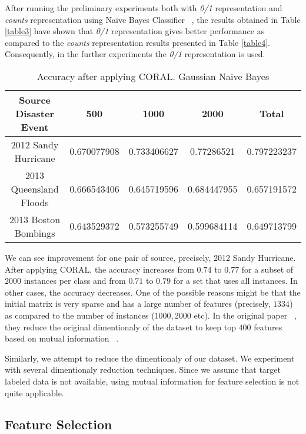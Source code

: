 After running the preliminary experiments both with \textit{0/1} representation and \textit{counts} representation using Naive Bayes Classifier ~\citep{tom}, the results obtained in Table \ref{table3} have shown that \textit{0/1} representation gives better performance as compared to the \textit{counts} representation results presented in Table \ref{table4}. Consequently, in the further experiments the \textit{0/1} representation is used.


\begin{table}[ht]
    \begin{center}
    \caption{Accuracy after applying CORAL. Gaussian Naive Bayes}
    \begin{tabular}[c]{|c|c|c|c|c|}
        \hline
        Source Disaster Event & 500 & 1000 & 2000 & Total \\
        \hline
        2012 Sandy Hurricane & 0.670077908 & 0.733406627 & 0.77286521 & 0.797223237 \\
        2013 Queensland Floods & 0.666543406 & 0.645719596 & 0.684447955 & 0.657191572\\
        2013 Boston Bombings & 0.643529372 & 0.573255749 & 0.599684114 & 0.649713799 \\
        \hline
    \end{tabular}
    \label{tablecoral}
   \end{center}
\end{table}

We can see improvement for one pair of source, precisely, 2012 Sandy Hurricane. After applying CORAL, the accuracy increases from $0.74$ to $0.77$ for a subset of $2000$ instances per class and from $0.71$ to $0.79$ for a set that uses all instances. In other cases, the accuracy decreases. One of the possible reasons might be that the initial matrix is very sparse and has a large number of features (precisely, $1334$) as compared to the number of instances ($1000, 2000$ etc). In the original paper ~\citep{coral}, they reduce the original dimentionaly of the dataset to keep top $400$ features based on mutual information ~\citep{hastie}. 

Similarly, we attempt to reduce the dimentionaly of our dataset. We experiment with several dimentionaly reduction techniques. Since we assume that target labeled data is not available, using mutual information for feature selection is not quite applicable.

\subsection{Feature Selection}
\label{varthressub}

